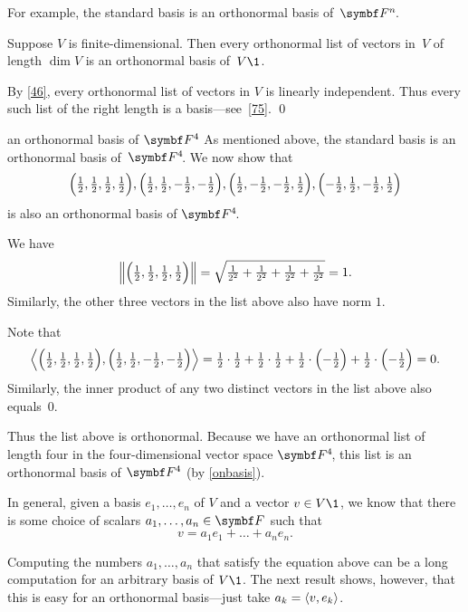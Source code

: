 For example, the standard basis is an orthonormal basis of~$\FF{n}$.

{Suppose $V$ is finite-dimensional. Then every orthonormal list of vectors in~$V$ of length $\dim V$ is an orthonormal basis of~$V\1$.}

\proof
By \ref{46}, every orthonormal list of vectors in $V$ is linearly independent. Thus every such list of the right length is a basis---see~\ref{75}.
\qed

\begin{example}[4FonBasis]{an orthonormal basis of\/ $\F{4}$}
As mentioned above,  the standard basis is an orthonormal basis of~$\FF{4}$. We now show that
\[
\paren[\Big]{\tfrac{1}{2}, \tfrac{1}{2}, \tfrac{1}{2}, \tfrac{1}{2}},
\paren[\Big]{\tfrac{1}{2}, \tfrac{1}{2}, -\tfrac{1}{2}, -\tfrac{1}{2}},
\paren[\Big]{\tfrac{1}{2}, -\tfrac{1}{2}, -\tfrac{1}{2}, \tfrac{1}{2}},
\paren[\Big]{-\tfrac{1}{2}, \tfrac{1}{2}, -\tfrac{1}{2}, \tfrac{1}{2}}
\]
is also an orthonormal basis of $\FF{4}$.

We have
\[
\norm[\Big]{ \paren[\Big]{\tfrac{1}{2}, \tfrac{1}{2}, \tfrac{1}{2}, \tfrac{1}{2}} }
= \sqrt{ \tfrac{1}{2^2} + \tfrac{1}{2^2} + \tfrac{1}{2^2}+ \tfrac{1}{2^2} }  = 1.
\]
Similarly, the other three vectors in the list above also have norm $1$.

Note that
\[
\ip[\Big]{ \paren[\Big]{\tfrac{1}{2}, \tfrac{1}{2}, \tfrac{1}{2}, \tfrac{1}{2}},
\paren[\Big]{ \tfrac{1}{2}, \tfrac{1}{2}, -\tfrac{1}{2}, -\tfrac{1}{2}} } =
\tfrac{1}{2} \cdot \tfrac{1}{2} + \tfrac{1}{2} \cdot \tfrac{1}{2}
+ \tfrac{1}{2} \cdot \paren[\Big]{-\tfrac{1}{2}} + \tfrac{1}{2} \cdot \paren[\Big]{ -\tfrac{1}{2} } = 0.
\]
Similarly, the inner product of any two distinct vectors in the list above also equals~$0$.

Thus the list above is orthonormal. Because we have an orthonormal list of length four in the four-dimensional vector space $\FF{4}$, this list is an orthonormal basis of $\F{4}$ (by \ref{onbasis}).
\end{example}

In general, given a basis $e_1, \dots, e_n$ of $V$ and a vector $v \in V\1$, we
know that there is some choice of scalars $a_1, \dots, a_n \in \F{}$ such that
\[
v = a_1 e_1 + \dots + a_n e_n.
\]

\noindent Computing the numbers $a_1, \dots, a_n$ that satisfy the equation above can be a long computation for an arbitrary basis of $V\1$. The next result shows, however,
that this is easy for an orthonormal basis---just take
$
a_k = \langle v, e_k\rangle$.

